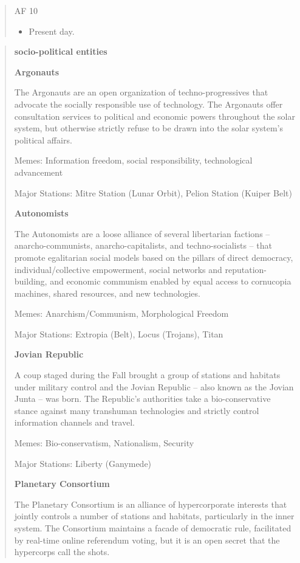 \begin{quote}
   AF 10
   \begin{itemize}
      \item Present day.
   \end{itemize}
\end{quote}


\begin{quote}
   \textbf{socio-political entities}


   \textbf{Argonauts}

   The Argonauts are an open organization of techno-progressives that advocate
   the socially responsible use of technology. The Argonauts offer
   consultation services to political and economic powers throughout the
   solar system, but otherwise strictly refuse to be drawn into the solar
   system's political affairs.

   Memes: Information freedom, social responsibility, technological advancement

   Major Stations: Mitre Station (Lunar Orbit), Pelion Station (Kuiper Belt) 


   \textbf{Autonomists}

   The Autonomists are a loose alliance of several libertarian factions -- 
   anarcho-communists, anarcho-capitalists, and techno-socialists -- that
   promote egalitarian social models based on the pillars of direct democracy,
   individual/collective empowerment, social networks and reputation-building,
   and economic communism enabled by equal access to cornucopia machines,
   shared resources, and new technologies.

   Memes: Anarchism/Communism, Morphological Freedom

   Major Stations: Extropia (Belt), Locus (Trojans), Titan


   \textbf{Jovian Republic}

   A coup staged during the Fall brought a group of stations and habitats
   under military control and the Jovian Republic -- also known as the Jovian
   Junta -- was born. The Republic's authorities take a bio-conservative
   stance against many transhuman technologies and strictly control
   information channels and travel.

   Memes: Bio-conservatism, Nationalism, Security

   Major Stations: Liberty (Ganymede)


   \textbf{Planetary Consortium}

   The Planetary Consortium is an alliance of hypercorporate interests that
   jointly controls a number of stations and habitats, particularly in the
   inner system. The Consortium maintains a facade of democratic rule,
   facilitated by real-time online referendum voting, but it is an open secret
   that the hypercorps call the shots.


\end{quote}
